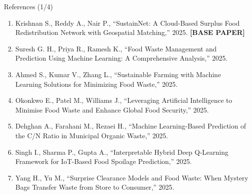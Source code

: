 \documentclass[aspectratio=169,xcolor=dvipsnames]{beamer}
\begin{document}
\begin{frame}{References (1/4)}
\tiny
\begin{enumerate}
    \item Krishnan S., Reddy A., Nair P., ``SustainNet: A Cloud-Based Surplus Food Redistribution Network with Geospatial Matching,'' 2025. \textbf{[BASE PAPER]}

    \item Suresh G. H., Priya R., Ramesh K., ``Food Waste Management and Prediction Using Machine Learning: A Comprehensive Analysis,'' 2025.

    \item Ahmed S., Kumar V., Zhang L., ``Sustainable Farming with Machine Learning Solutions for Minimizing Food Waste,'' 2025.

    \item Okonkwo E., Patel M., Williams J., ``Leveraging Artificial Intelligence to Minimise Food Waste and Enhance Global Food Security,'' 2025.

    \item Dehghan A., Farahani M., Rezaei H., ``Machine Learning-Based Prediction of the C/N Ratio in Municipal Organic Waste,'' 2025.

    \item Singh I., Sharma P., Gupta A., ``Interpretable Hybrid Deep Q-Learning Framework for IoT-Based Food Spoilage Prediction,'' 2025.

    \item Yang H., Yu M., ``Surprise Clearance Models and Food Waste: When Mystery Bags Transfer Waste from Store to Consumer,'' 2025.
\end{enumerate}
\end{frame}
\end{document}
